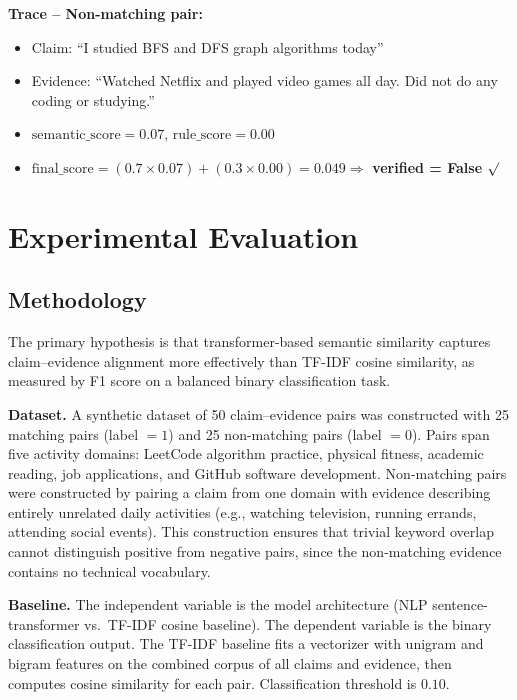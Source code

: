 \documentclass[11pt]{article}
\begin{document}
\textbf{Trace -- Non-matching pair:}
\begin{itemize}
    \item Claim: ``I studied BFS and DFS graph algorithms today''
    \item Evidence: ``Watched Netflix and played video games all day. Did not do
    any coding or studying.''
    \item $\text{semantic\_score} = 0.07$, \quad $\text{rule\_score} = 0.00$
    \item $\text{final\_score} = (0.7 \times 0.07) + (0.3 \times 0.00) = 0.049
    \Rightarrow$ \textbf{verified = False} $\surd$
\end{itemize}

\section{Experimental Evaluation}

\subsection{Methodology}

The primary hypothesis is that transformer-based semantic similarity captures
claim--evidence alignment more effectively than TF-IDF cosine similarity, as measured
by F1 score on a balanced binary classification task.

\textbf{Dataset.} A synthetic dataset of 50 claim--evidence pairs was constructed with
25 matching pairs (label $= 1$) and 25 non-matching pairs (label $= 0$). Pairs span
five activity domains: LeetCode algorithm practice, physical fitness, academic reading,
job applications, and GitHub software development. Non-matching pairs were constructed
by pairing a claim from one domain with evidence describing entirely unrelated daily
activities (e.g., watching television, running errands, attending social events). This
construction ensures that trivial keyword overlap cannot distinguish positive from
negative pairs, since the non-matching evidence contains no technical vocabulary.

\textbf{Baseline.} The independent variable is the model architecture (NLP
sentence-transformer vs.\ TF-IDF cosine baseline). The dependent variable is the
binary classification output. The TF-IDF baseline fits a vectorizer with unigram and
bigram features on the combined corpus of all claims and evidence, then computes
cosine similarity for each pair. Classification threshold is $0.10$.
\end{document}
